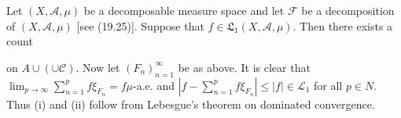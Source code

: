 Let $(X, \mathcal{A}, \mu)$ be a decomposable measure space and let $\mathcal{F}$ be a decomposition of $(X, \mathcal{A}, \mu)$ [see (19.25)]. Suppose that $f \in \mathfrak{L}_1(X, \mathcal{A}, \mu)$. Then there exists a count

on $A \cup (\cup \mathcal{C})$. Now let $(F_n)_{n=1}^{\infty}$ be as above. It is clear that $\lim_{p \to \infty} \sum_{n=1}^{p} f \xi_F_n = f \mu$-a.e. and $\left| f - \sum_{n=1}^{p} f \xi_F_n \right| \leq |f| \in \mathcal{L}_1$ for all $p \in N$. Thus (i) and (ii) follow from Lebesgue's theorem on dominated convergence.